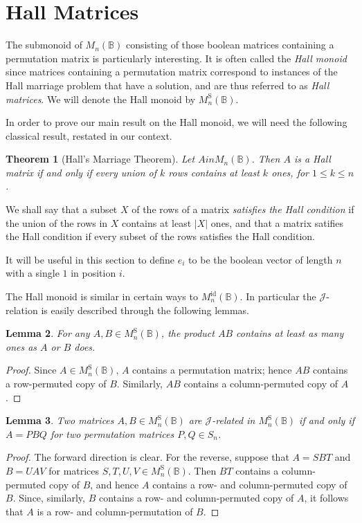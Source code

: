 \documentclass[11pt]{article}
\newtheorem{thm}{Theorem}[section]
\newtheorem{lemma}[thm]{Lemma}
\numberwithin{equation}{section}
\newcommand{\B}{\mathbb{B}}
\newcommand{\Bn}{M_n(\B)}
\newcommand{\Refn}{M_n^{\text{id}}(\B)}
\newcommand{\Halln}{M_n^{\text{S}}(\B)}
\newcommand{\J}{\mathscr{J}}
\begin{document}
\section{Hall Matrices}
The submonoid of $\Bn$ consisting of those boolean matrices containing a
permutation matrix is particularly interesting. It is often called the
\emph{Hall monoid} since matrices containing a permutation matrix correspond to
instances of the Hall marriage problem that have a solution, and are thus
referred to as \emph{Hall matrices}. We will denote the Hall monoid by
$\Halln$. 

In order to prove our main result on the Hall monoid, we will need the following
classical result, restated in our context.

\begin{thm}[Hall's Marriage Theorem]
  Let $A in \Bn$. Then $A$ is a Hall matrix if and only if every union of $k$
  rows contains at least $k$ ones, for $1 \leq k \leq n$.
\end{thm}
We shall say that a subset $X$ of the rows of a matrix \emph{satisfies the Hall
  condition} if the union of the rows in $X$ contains at least $|X|$ ones, and
that a matrix satifies the Hall condition if every subset of the rows satisfies
the Hall condition.

It will be useful in this section to define $e_i$ to be the boolean vector of
length $n$ with a single $1$ in position $i$.

The Hall monoid is similar in certain ways to $\Refn$. In particular
the $\J$-relation is easily described through the following lemmas.

\begin{lemma}
  For any $A, B \in \Halln$, the product $AB$ contains at least as many ones as
  $A$ or $B$ does.
\end{lemma}
\begin{proof}
  Since $A \in \Halln$, $A$ contains a permutation matrix; hence $AB$ contains a
  row-permuted copy of $B$. Similarly, $AB$ contains a column-permuted copy of
  $A$.
\end{proof}

\begin{lemma}
  Two matrices $A, B \in \Halln$ are $\J$-related in $\Halln$ if and only if $A
  = PBQ$ for two permutation matrices $P, Q \in S_n$.
\end{lemma}
\begin{proof}
  The forward direction is clear. For the reverse, suppose that $A = SBT$ and $B
  = UAV$ for matrices $S, T, U, V \in \Halln$. Then $BT$ contains a
  column-permuted copy of $B$, and hence $A$ contains a row- and column-permuted
  copy of $B$. Since, similarly, $B$ contains a row- and column-permuted copy of
  $A$, it follows that $A$ is a row- and column-permutation of $B$.
\end{proof}
\end{document}
